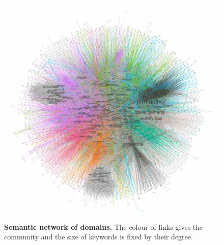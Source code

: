 \documentclass[10pt]{article}
\begin{document}
\begin{figure}
\includegraphics[width=\linewidth]{figures/A-quantepistemo-semanticnw.jpg}
\caption{\textbf{Semantic network of domains.} The colour of links gives the community and the size of keywords is fixed by their degree.\label{fig:semanticnw}}
\end{figure}
\end{document}
